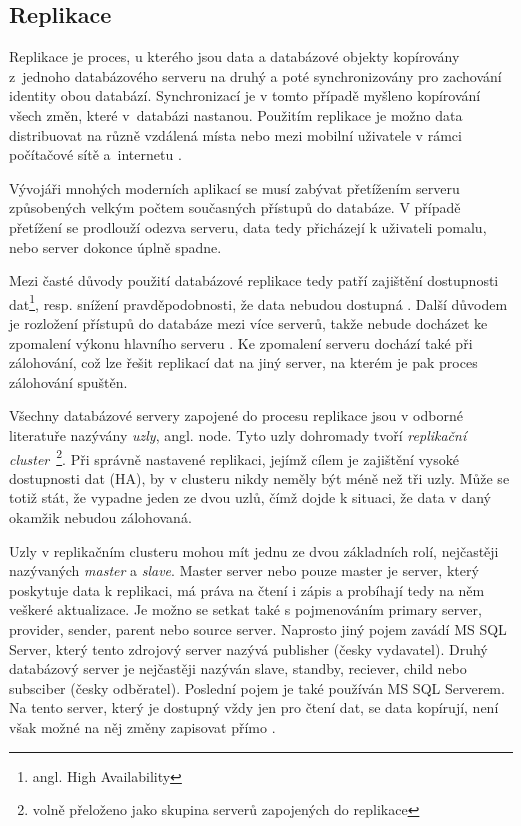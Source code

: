 \subsection{Replikace}
\label{kReplikace}
  Replikace je proces, u kterého jsou data a databázové objekty kopírovány z~jednoho databázového serveru na druhý a poté synchronizovány pro zachování
  identity obou databází. Synchronizací je v tomto případě myšleno kopírování
  všech změn, které v~databázi nastanou. Použitím replikace je možno data
  distribuovat na různě vzdálená místa nebo mezi mobilní uživatele v rámci
  počítačové sítě a~internetu \cite{Microsoft2013}.

  Vývojáři mnohých moderních aplikací se musí zabývat přetížením serveru
  způsobených velkým počtem současných přístupů do databáze. V případě pře\-tí\-že\-ní
  se prodlouží odezva serveru, data tedy přicházejí k uživateli pomalu, nebo
  server dokonce úplně spadne. 

  Mezi časté důvody použití databázové replikace tedy patří zajištění dostupnosti
  dat\footnote{angl. High Availability}, resp. snížení pravděpodobnosti, že data
  nebudou dostupná \cite{ObeHsu2012}. Další důvodem je rozložení přístupů do
  databáze mezi více serverů, takže nebude docházet ke zpomalení výkonu hlavního
  serveru \cite{BellKindahlThalmann2010}. Ke zpomalení serveru dochází také při
  zálohování, což lze řešit replikací dat na jiný server, na kterém je pak proces
  zálohování spuštěn. 

  Všechny databázové servery zapojené do procesu replikace jsou v odborné
  li\-te\-ra\-tu\-ře nazývány {\it uzly}, angl. node. Tyto uzly dohromady tvoří
  {\it replikační cluster}~\footnote{volně přeloženo jako skupina serverů
  zapojených do replikace}. Při správně nastavené replikaci, jejímž cílem je
  zajištění vysoké dostupnosti dat (HA), by v clusteru nikdy neměly být méně než
  tři uzly. Může se totiž stát, že vypadne jeden ze dvou uzlů, čímž dojde k
  situaci, že data v daný okamžik nebudou zálohovaná. 

  Uzly v replikačním clusteru mohou mít jednu ze dvou základních rolí, nej\-čas\-tě\-ji
  nazývaných {\it master} a {\it slave}. Master server nebo pouze master je
  server, který poskytuje data k replikaci, má práva na čtení i zápis a probíhají
  tedy na něm veškeré aktualizace. Je možno se setkat také s pojmenováním primary
  server, provider, sender, parent nebo source server. Naprosto jiný pojem zavádí
  MS SQL Server, který tento zdrojový server nazývá publisher (česky vydavatel).
  Druhý databázový server je nejčastěji nazýván slave, standby, reciever, child
  nebo subsciber (česky odběratel). Poslední pojem je také používán MS SQL
  Serverem. Na tento server, který je dostupný vždy jen pro čtení dat, se data
  kopírují, není však možné na něj změny zapisovat přímo \cite{RiggsKrossing2010}.

